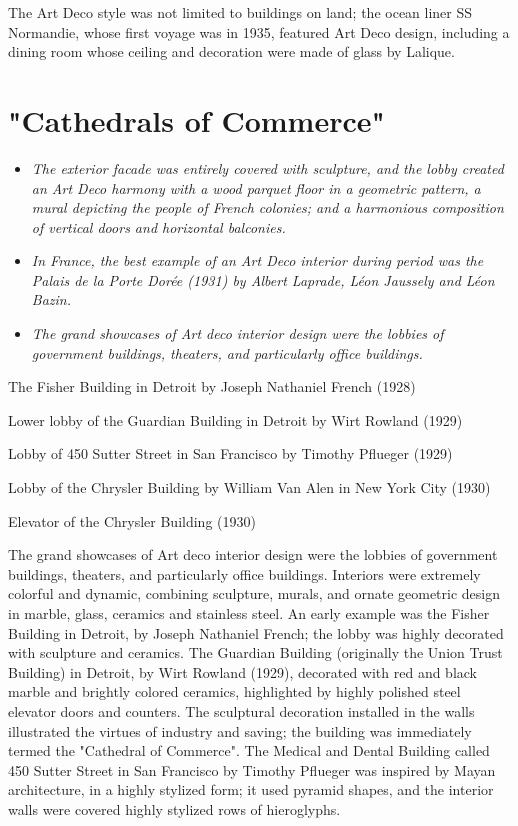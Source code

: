 The Art Deco style was not limited to buildings on land; the ocean liner
SS Normandie, whose first voyage was in 1935, featured Art Deco design,
including a dining room whose ceiling and decoration were made of glass
by Lalique.

\section{"Cathedrals of Commerce"}\label{cathedrals-of-commerce}

\begin{itemize}
\item
  \emph{The exterior facade was entirely covered with sculpture, and the
  lobby created an Art Deco harmony with a wood parquet floor in a
  geometric pattern, a mural depicting the people of French colonies;
  and a harmonious composition of vertical doors and horizontal
  balconies.}
\item
  \emph{In France, the best example of an Art Deco interior during
  period was the Palais de la Porte Dorée (1931) by Albert Laprade, Léon
  Jaussely and Léon Bazin.}
\item
  \emph{The grand showcases of Art deco interior design were the lobbies
  of government buildings, theaters, and particularly office buildings.}
\end{itemize}

The Fisher Building in Detroit by Joseph Nathaniel French (1928)

Lower lobby of the Guardian Building in Detroit by Wirt Rowland (1929)

Lobby of 450 Sutter Street in San Francisco by Timothy Pflueger (1929)

Lobby of the Chrysler Building by William Van Alen in New York City
(1930)

Elevator of the Chrysler Building (1930)

The grand showcases of Art deco interior design were the lobbies of
government buildings, theaters, and particularly office buildings.
Interiors were extremely colorful and dynamic, combining sculpture,
murals, and ornate geometric design in marble, glass, ceramics and
stainless steel. An early example was the Fisher Building in Detroit, by
Joseph Nathaniel French; the lobby was highly decorated with sculpture
and ceramics. The Guardian Building (originally the Union Trust
Building) in Detroit, by Wirt Rowland (1929), decorated with red and
black marble and brightly colored ceramics, highlighted by highly
polished steel elevator doors and counters. The sculptural decoration
installed in the walls illustrated the virtues of industry and saving;
the building was immediately termed the "Cathedral of Commerce". The
Medical and Dental Building called 450 Sutter Street in San Francisco by
Timothy Pflueger was inspired by Mayan architecture, in a highly
stylized form; it used pyramid shapes, and the interior walls were
covered highly stylized rows of hieroglyphs.

